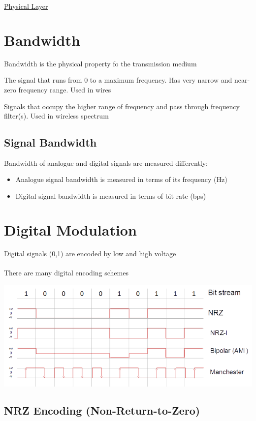 \documentclass{article}[18pt]
\begin{document}
\begin{center}
\underline{\huge Physical Layer}
\end{center}
\section{Bandwidth}
Bandwidth is the physical property fo the transmission medium
\begin{defin}[Baseband]
	The signal that runs from 0 to a maximum frequency. Has very narrow and near-zero frequency range. Used in wires
\end{defin}
\begin{defin}[Passband]
	Signals that occupy the higher range of frequency and pass through frequency filter(s). Used in wireless spectrum
\end{defin}
\subsection{Signal Bandwidth}
Bandwidth of analogue and digital signals are measured differently:
\begin{itemize}
	\item Analogue signal bandwidth is measured in terms of its frequency (Hz)
	\item Digital signal bandwidth is measured in terms of bit rate (bps)
\end{itemize}
\section{Digital Modulation}
Digital signals (0,1) are encoded by low and high voltage\\
\\
There are many digital encoding schemes
\begin{center}
	\includegraphics[scale=0.7]{Modulation}
\end{center}
\subsection{NRZ Encoding (Non-Return-to-Zero)}
\end{document}

